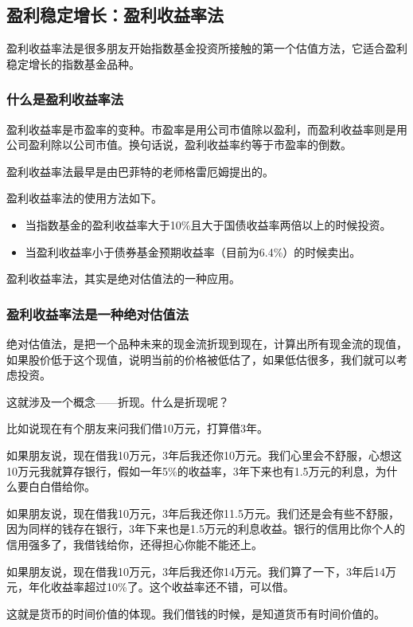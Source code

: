 \subsection{盈利稳定增长：盈利收益率法}
盈利收益率法是很多朋友开始指数基金投资所接触的第一个估值方法，它适合盈利稳定增长的指数基金品种。

\subsubsection{什么是盈利收益率法}

盈利收益率是市盈率的变种。市盈率是用公司市值除以盈利，而盈利收益率则是用公司盈利除以公司市值。换句话说，盈利收益率约等于市盈率的倒数。

盈利收益率法最早是由巴菲特的老师格雷厄姆提出的。

盈利收益率法的使用方法如下。

\begin{itemize}
\item 当指数基金的盈利收益率大于10\%且大于国债收益率两倍以上的时候投资。
\item 当盈利收益率小于债券基金预期收益率（目前为6.4\%）的时候卖出。
\end{itemize}

盈利收益率法，其实是绝对估值法的一种应用。

\subsubsection{盈利收益率法是一种绝对估值法}

绝对估值法，是把一个品种未来的现金流折现到现在，计算出所有现金流的现值，如果股价低于这个现值，说明当前的价格被低估了，如果低估很多，我们就可以考虑投资。

这就涉及一个概念——折现。什么是折现呢？

比如说现在有个朋友来问我们借10万元，打算借3年。

如果朋友说，现在借我10万元，3年后我还你10万元。我们心里会不舒服，心想这10万元我就算存银行，假如一年5\%的收益率，3年下来也有1.5万元的利息，为什么要白白借给你。

如果朋友说，现在借我10万元，3年后我还你11.5万元。我们还是会有些不舒服，因为同样的钱存在银行，3年下来也是1.5万元的利息收益。银行的信用比你个人的信用强多了，我借钱给你，还得担心你能不能还上。

如果朋友说，现在借我10万元，3年后我还你14万元。我们算了一下，3年后14万元，年化收益率超过10\%了。这个收益率还不错，可以借。

这就是货币的时间价值的体现。我们借钱的时候，是知道货币有时间价值的。

